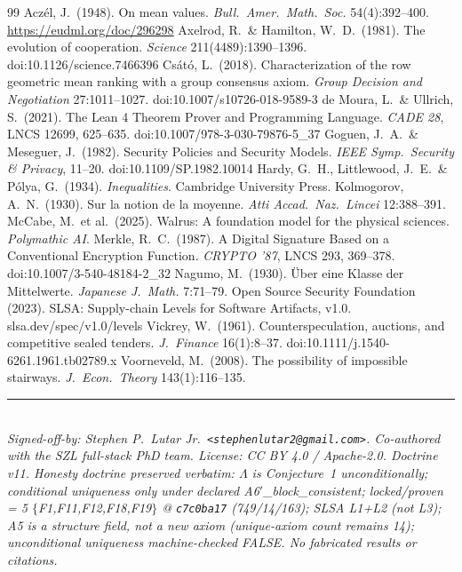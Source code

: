 \documentclass[11pt]{article}
\theoremstyle{plain}
\theoremstyle{definition}
\theoremstyle{remark}
\newcommand{\La}{\Lambda}
\begin{document}
\begin{thebibliography}{99}
 Acz\'el, J.\ (1948). On mean values. \emph{Bull.\ Amer.\ Math.\ Soc.} 54(4):392--400. \url{https://eudml.org/doc/296298}
 Axelrod, R.\ \& Hamilton, W.\ D.\ (1981). The evolution of cooperation. \emph{Science} 211(4489):1390--1396. doi:10.1126/science.7466396
 Cs\'at\'o, L.\ (2018). Characterization of the row geometric mean ranking with a group consensus axiom. \emph{Group Decision and Negotiation} 27:1011--1027. doi:10.1007/s10726-018-9589-3
 de Moura, L.\ \& Ullrich, S.\ (2021). The Lean 4 Theorem Prover and Programming Language. \emph{CADE 28}, LNCS 12699, 625--635. doi:10.1007/978-3-030-79876-5\_37
 Goguen, J.\ A.\ \& Meseguer, J.\ (1982). Security Policies and Security Models. \emph{IEEE Symp.\ Security \& Privacy}, 11--20. doi:10.1109/SP.1982.10014
 Hardy, G.\ H., Littlewood, J.\ E.\ \& P\'olya, G.\ (1934). \emph{Inequalities}. Cambridge University Press.
 Kolmogorov, A.\ N.\ (1930). Sur la notion de la moyenne. \emph{Atti Accad.\ Naz.\ Lincei} 12:388--391.
 McCabe, M.\ et al.\ (2025). Walrus: A foundation model for the physical sciences. \emph{Polymathic AI}.
 Merkle, R.\ C.\ (1987). A Digital Signature Based on a Conventional Encryption Function. \emph{CRYPTO '87}, LNCS 293, 369--378. doi:10.1007/3-540-48184-2\_32
 Nagumo, M.\ (1930). \"Uber eine Klasse der Mittelwerte. \emph{Japanese J.\ Math.} 7:71--79.
 Open Source Security Foundation (2023). SLSA: Supply-chain Levels for Software Artifacts, v1.0. slsa.dev/spec/v1.0/levels
 Vickrey, W.\ (1961). Counterspeculation, auctions, and competitive sealed tenders. \emph{J.\ Finance} 16(1):8--37. doi:10.1111/j.1540-6261.1961.tb02789.x
 Voorneveld, M.\ (2008). The possibility of impossible stairways. \emph{J.\ Econ.\ Theory} 143(1):116--135.
\end{thebibliography}

\vspace{1em}
\noindent\rule{\linewidth}{0.4pt}\\[4pt]
{\small\itshape Signed-off-by: Stephen P.\ Lutar Jr.\ \texttt{<stephenlutar2@gmail.com>}.
Co-authored with the SZL full-stack PhD team. License: CC BY 4.0 / Apache-2.0.
Doctrine v11. Honesty doctrine preserved verbatim: $\La$ is Conjecture~1
unconditionally; conditional uniqueness only under declared A6$'$\_block\_consistent;
locked/proven = 5 $\{$F1,F11,F12,F18,F19$\}$ @ \texttt{c7c0ba17} (749/14/163); SLSA
L1+L2 (not L3); A5 is a structure field, not a new axiom (unique-axiom count remains
14); unconditional uniqueness machine-checked FALSE. No fabricated results or
citations.}
\end{document}
